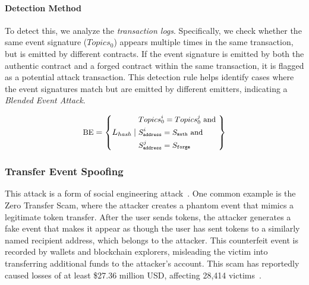\paragraph{Detection Method}
To detect this, we analyze the \emph{transaction logs}. Specifically, we check whether the same event signature (\( Topics_0 \)) appears multiple times in the same transaction, but is emitted by different contracts. If the event signature is emitted by both the authentic contract and a forged contract within the same transaction, it is flagged as a potential attack transaction. This detection rule helps identify cases where the event signatures match but are emitted by different emitters, indicating a \emph{Blended Event Attack}.


\begin{equation}
\small
\text{BE} = \left\{
L_{\textit{hash}} \mid
\begin{aligned}
  & Topics_0^i = Topics_0^j \text{ and } \\
  & S_{\texttt{address}}^i = S_{\texttt{auth}} \text{ and } \\
  & S_{\texttt{address}}^j = S_{\texttt{forge}}
\end{aligned}
\right\}
\end{equation}



\subsubsection{Transfer Event Spoofing}\label{vec:attack4}

This attack is a form of social engineering attack~\cite{social_engineer}. One common example is the Zero Transfer Scam, where the attacker creates a phantom event that mimics a legitimate token transfer. After the user sends tokens, the attacker generates a fake event that makes it appear as though the user has sent tokens to a similarly named recipient address, which belongs to the attacker. This counterfeit event is recorded by wallets and blockchain explorers, misleading the victim into transferring additional funds to the attacker's account. This scam has reportedly caused losses of at least \$27.36 million USD, affecting 28,414 victims~\cite{wallet_visual}.

